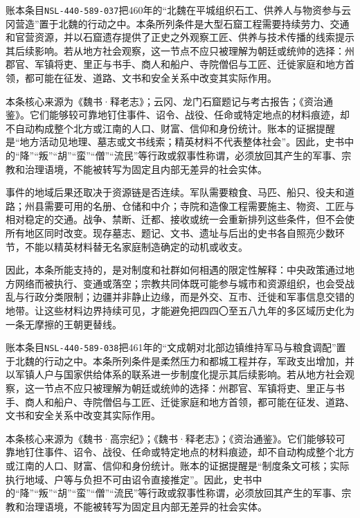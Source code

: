 账本条目\texttt{NSL-440-589-037}把460年的“北魏在平城组织石工、供养人与物资参与云冈营造”置于北魏的行动之中。本条所列条件是大型石窟工程需要持续劳力、交通和官营资源，并以石窟遗存提供了正史之外观察工匠、供养与技术传播的线索提示其后续影响。若从地方社会观察，这一节点不应只被理解为朝廷或统帅的选择：州郡官、军镇将吏、里正与书手、商人和船户、寺院僧侣与工匠、迁徙家庭和地方首领，都可能在征发、道路、文书和安全关系中改变其实际作用。

本条核心来源为《魏书·释老志》；云冈、龙门石窟题记与考古报告；《资治通鉴》。它们能够较可靠地钉住事件、诏令、战役、任命或特定地点的材料痕迹，却不自动构成整个北方或江南的人口、财富、信仰和身份统计。账本的证据提醒是“地方活动见地理、墓志或文书线索；精英材料不代表整体社会”。因此，史书中的“降”“叛”“胡”“蛮”“僧”“流民”等行政或叙事性称谓，必须放回其产生的军事、宗教和治理语境，不能被转写为固定且内部无差异的社会实体。

事件的地域后果还取决于资源链是否连续。军队需要粮食、马匹、船只、役夫和道路；州县需要可用的名册、仓储和中介；寺院和造像工程需要施主、物资、工匠与相对稳定的交通。战争、禁断、迁都、接收或统一会重新排列这些条件，但不会使所有地区同时改变。现存墓志、题记、文书、遗址与后出的史书各自照亮少数环节，不能以精英材料替无名家庭制造确定的动机或收支。

因此，本条所能支持的，是对制度和社群如何相遇的限定性解释：中央政策通过地方网络而被执行、变通或落空；宗教共同体既可能参与城市和资源组织，也会受战乱与行政分类限制；边疆并非静止边缘，而是外交、互市、迁徙和军事信息交错的地带。让这些材料边界持续可见，才能避免把四四〇至五八九年的多区域历史化为一条无摩擦的王朝更替线。

账本条目\texttt{NSL-440-589-038}把461年的“文成朝对北部边镇维持军马与粮食调配”置于北魏的行动之中。本条所列条件是柔然压力和都城工程并存，军政支出增加，并以军镇人户与国家供给体系的联系进一步制度化提示其后续影响。若从地方社会观察，这一节点不应只被理解为朝廷或统帅的选择：州郡官、军镇将吏、里正与书手、商人和船户、寺院僧侣与工匠、迁徙家庭和地方首领，都可能在征发、道路、文书和安全关系中改变其实际作用。

本条核心来源为《魏书·高宗纪》；《魏书·释老志》；《资治通鉴》。它们能够较可靠地钉住事件、诏令、战役、任命或特定地点的材料痕迹，却不自动构成整个北方或江南的人口、财富、信仰和身份统计。账本的证据提醒是“制度条文可核；实际执行地域、户等与负担不可由诏令直接推定”。因此，史书中的“降”“叛”“胡”“蛮”“僧”“流民”等行政或叙事性称谓，必须放回其产生的军事、宗教和治理语境，不能被转写为固定且内部无差异的社会实体。

